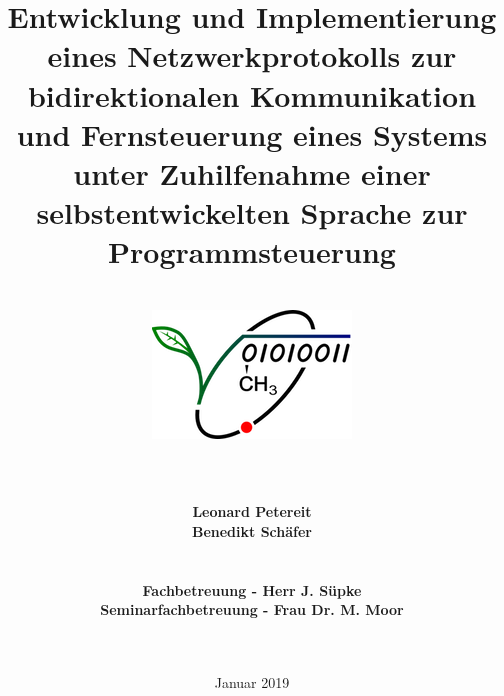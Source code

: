 \documentclass[12pt,a4paper]{scrartcl}
\begin{document}
\title{Entwicklung und Implementierung eines Netzwerkprotokolls zur bidirektionalen Kommunikation und Fernsteuerung eines Systems unter Zuhilfenahme einer selbstentwickelten Sprache zur Programmsteuerung}
\date{Januar 2019}
\author{\hfill\\ 
\includegraphics[scale=2.5]{logo}\hfill\\\hfill\\\hfill\\\hfill\\\textbf{Leonard Petereit}\\\textbf{Benedikt Schäfer}\\\hfill\\\hfill\\
\textbf{Fachbetreuung - Herr J. Süpke}\\
\textbf{Seminarfachbetreuung - Frau Dr. M. Moor}
\hfill\\\hfill\\\hfill\\
}
\maketitle
\newpage
\tableofcontents

\newpage



\newpage



\newpage



\newpage



\newpage

\end{document}

